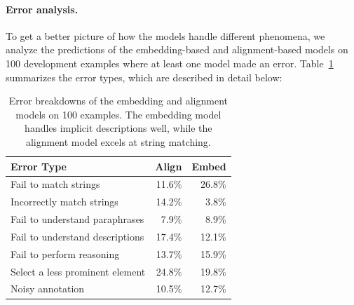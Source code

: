 \paragraph{Error analysis.}
To get a better picture of how the models handle
different phenomena,
we analyze the predictions of the embedding-based
and alignment-based models on 100 development examples
where at least one model made an error.
Table~\ref{tab:webrep-errors} summarizes
the error types, which are described in detail below:

\begin{table}[t]
\centering
\begin{tabular}{lrr}\toprule
\textbf{Error Type} & \textbf{Align} & \textbf{Embed} \\
\midrule
Fail to match strings & 11.6\% & 26.8\% \\
Incorrectly match strings & 14.2\% & 3.8\% \\
Fail to understand paraphrases & 7.9\% & 8.9\% \\
Fail to understand descriptions & 17.4\% & 12.1\% \\
Fail to perform reasoning & 13.7\% & 15.9\% \\
Select a less prominent element & 24.8\% & 19.8\% \\
Noisy annotation & 10.5\% & 12.7\% \\
\bottomrule
\end{tabular}
\caption[
Error breakdowns of the embedding and alignment models
on 100 examples.
]{
Error breakdowns of the embedding and alignment models
on 100 examples.
The embedding model handles implicit descriptions well, while
the alignment model excels at string matching.}
\label{tab:webrep-errors}
\end{table}

